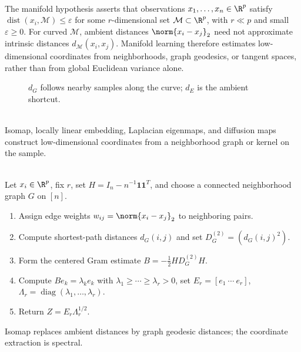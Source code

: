 \begin{remark} \label{rem:sl-manifold-hypothesis} \\
The manifold hypothesis asserts that observations $x_1,\ldots,x_n\in\R^p$ satisfy $\operatorname{dist}(x_i,\mathcal{M})\leq\varepsilon$ for some $r$-dimensional set $\mathcal{M}\subset\R^p$, with $r\ll p$ and small $\varepsilon\geq0$.
For curved $\mathcal{M}$, ambient distances $\norm{x_i-x_j}_2$ need not approximate intrinsic distances $d_{\mathcal{M}}(x_i,x_j)$.
Manifold learning therefore estimates low-dimensional coordinates from neighborhoods, graph geodesics, or tangent spaces, rather than from global Euclidean variance alone.
\end{remark}

\begin{figure}[H]
\centering

\caption{\textcolor{blue!70!black}{$d_G$} follows nearby samples along the curve; \textcolor{red!75!black}{$d_E$} is the ambient shortcut.}
\label{fig:sl-mds-local-vs-global-distance}
\end{figure}

\begin{example} \label{ex:sl-manifold-methods} \\
Isomap, locally linear embedding, Laplacian eigenmaps, and diffusion maps construct low-dimensional coordinates from a neighborhood graph or kernel on the sample.
\end{example}

\begin{method} \label{meth:sl-isomap} \\
Let $x_i\in\R^p$, fix $r$, set $H=I_n-n^{-1}\mathbf{1}\mathbf{1}^T$, and choose a connected neighborhood graph $G$ on $[n]$.
\begin{enumerate}[label=(\roman*)]
\setlength{\itemsep}{0pt}
\item Assign edge weights $w_{ij}=\norm{x_i-x_j}_2$ to neighboring pairs.
\item Compute shortest-path distances $d_G(i,j)$ and set $D_G^{(2)}=(d_G(i,j)^2)$.
\item Form the centered Gram estimate $B=-\frac12HD_G^{(2)}H$.
\item Compute $Be_k=\lambda_ke_k$ with $\lambda_1\geq\cdots\geq\lambda_r>0$, set $E_r=[e_1\ \cdots\ e_r]$, $\Lambda_r=\operatorname{diag}(\lambda_1,\ldots,\lambda_r)$.
\item Return $Z=E_r\Lambda_r^{1/2}$.
\end{enumerate}
Isomap replaces ambient distances by graph geodesic distances; the coordinate extraction is spectral.
\end{method}

